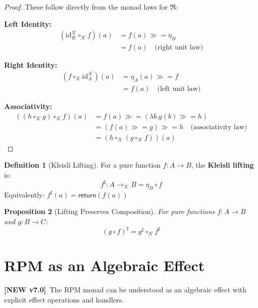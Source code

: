 \documentclass[11pt,twoside,openright]{book}
\theoremstyle{definition}
\newtheorem{definition}{Definition}[chapter]
\theoremstyle{plain}
\newtheorem{proposition}[definition]{Proposition}
\theoremstyle{remark}
\newcommand{\RPM}{\mathfrak{R}}
\newcommand{\rpmret}{\mathsf{return}}
\newcommand{\rpmbind}{\mathbin{\gg\!=}}
\newcommand{\id}{\mathrm{id}}
\newcommand{\Kleisli}{\mathcal{K}}
\newcommand{\vnew}{\textcolor{blue!70!black}{\textbf{[NEW v7.0]}}}
\begin{document}
\begin{proof}
These follow directly from the monad laws for $\RPM$:

\textbf{Left Identity:}
\begin{align}
(\id_B^\Kleisli \circ_\Kleisli f)(a) &= f(a) \rpmbind \eta_B \\
&= f(a) \quad \text{(right unit law)}
\end{align}

\textbf{Right Identity:}
\begin{align}
(f \circ_\Kleisli \id_A^\Kleisli)(a) &= \eta_A(a) \rpmbind f \\
&= f(a) \quad \text{(left unit law)}
\end{align}

\textbf{Associativity:}
\begin{align}
((h \circ_\Kleisli g) \circ_\Kleisli f)(a) &= f(a) \rpmbind (\lambda b. g(b) \rpmbind h) \\
&= (f(a) \rpmbind g) \rpmbind h \quad \text{(associativity law)} \\
&= (h \circ_\Kleisli (g \circ_\Kleisli f))(a)
\end{align}
\end{proof}

\begin{definition}[Kleisli Lifting]
\label{def:kleisli-lift}
For a pure function $f : A \to B$, the \textbf{Kleisli lifting} is:
\[
f^\sharp : A \to_\Kleisli B = \eta_B \circ f
\]
Equivalently: $f^\sharp(a) = \rpmret(f(a))$
\end{definition}

\begin{proposition}[Lifting Preserves Composition]
\label{prop:lift-comp}
For pure functions $f : A \to B$ and $g : B \to C$:
\[
(g \circ f)^\sharp = g^\sharp \circ_\Kleisli f^\sharp
\]
\end{proposition}

\section{RPM as an Algebraic Effect}
\label{sec:rpm-effects}

\vnew\ The RPM monad can be understood as an algebraic effect with explicit effect operations and handlers.
\end{document}
